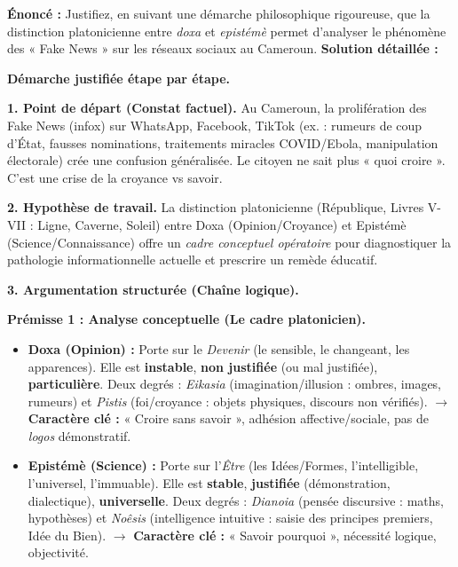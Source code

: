\documentclass[11pt]{article}
\newcommand{\cle}[1]{{\popxbold\color{popdark}#1}}
\begin{document}
\begin{exoresolu}
\textbf{Énoncé :} Justifiez, en suivant une démarche philosophique rigoureuse, que la distinction platonicienne entre \emph{doxa} et \emph{epistémè} permet d'analyser le phénomène des « Fake News » sur les réseaux sociaux au Cameroun.
\tcblower
\textbf{Solution détaillée :}

\textbf{Démarche justifiée étape par étape.}

\textbf{1. Point de départ (Constat factuel).}
Au Cameroun, la prolifération des \cle{Fake News} (infox) sur WhatsApp, Facebook, TikTok (ex. : rumeurs de coup d'État, fausses nominations, traitements miracles COVID/Ebola, manipulation électorale) crée une confusion généralisée. Le citoyen ne sait plus « quoi croire ». C'est une crise de la \cle{croyance} vs \cle{savoir}.

\textbf{2. Hypothèse de travail.}
La distinction platonicienne (République, Livres V-VII : Ligne, Caverne, Soleil) entre \cle{Doxa} (Opinion/Croyance) et \cle{Epistémè} (Science/Connaissance) offre un \emph{cadre conceptuel opératoire} pour diagnostiquer la pathologie informationnelle actuelle et prescrire un remède éducatif.

\textbf{3. Argumentation structurée (Chaîne logique).}

\textbf{Prémisse 1 : Analyse conceptuelle (Le cadre platonicien).}
\begin{itemize}
    \item \textbf{Doxa (Opinion) :} Porte sur le \emph{Devenir} (le sensible, le changeant, les apparences). Elle est \textbf{instable}, \textbf{non justifiée} (ou mal justifiée), \textbf{particulière}. Deux degrés : \emph{Eikasia} (imagination/illusion : ombres, images, rumeurs) et \emph{Pistis} (foi/croyance : objets physiques, discours non vérifiés). $\rightarrow$ \textbf{Caractère clé :} « Croire sans savoir », adhésion affective/sociale, pas de \emph{logos} démonstratif.
    \item \textbf{Epistémè (Science) :} Porte sur l'\emph{Être} (les Idées/Formes, l'intelligible, l'universel, l'immuable). Elle est \textbf{stable}, \textbf{justifiée} (démonstration, dialectique), \textbf{universelle}. Deux degrés : \emph{Dianoia} (pensée discursive : maths, hypothèses) et \emph{Noêsis} (intelligence intuitive : saisie des principes premiers, Idée du Bien). $\rightarrow$ \textbf{Caractère clé :} « Savoir pourquoi », nécessité logique, objectivité.
\end{itemize}


\end{exoresolu}
\end{document}
